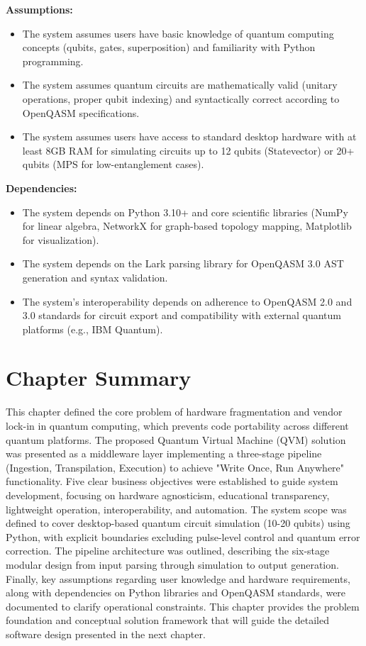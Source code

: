 \textbf{Assumptions:}
\begin{itemize}
    \item The system assumes users have basic knowledge of quantum computing concepts (qubits, gates, superposition) and familiarity with Python programming.
    \item The system assumes quantum circuits are mathematically valid (unitary operations, proper qubit indexing) and syntactically correct according to OpenQASM specifications.
    \item The system assumes users have access to standard desktop hardware with at least 8GB RAM for simulating circuits up to 12 qubits (Statevector) or 20+ qubits (MPS for low-entanglement cases).
\end{itemize}

\textbf{Dependencies:}
\begin{itemize}
    \item The system depends on Python 3.10+ and core scientific libraries (NumPy for linear algebra, NetworkX for graph-based topology mapping, Matplotlib for visualization).
    \item The system depends on the Lark parsing library for OpenQASM 3.0 AST generation and syntax validation.
    \item The system's interoperability depends on adherence to OpenQASM 2.0 and 3.0 standards for circuit export and compatibility with external quantum platforms (e.g., IBM Quantum).
\end{itemize}

\section{Chapter Summary}

This chapter defined the core problem of hardware fragmentation and vendor lock-in in quantum computing, which prevents code portability across different quantum platforms. The proposed Quantum Virtual Machine (QVM) solution was presented as a middleware layer implementing a three-stage pipeline (Ingestion, Transpilation, Execution) to achieve "Write Once, Run Anywhere" functionality. Five clear business objectives were established to guide system development, focusing on hardware agnosticism, educational transparency, lightweight operation, interoperability, and automation. The system scope was defined to cover desktop-based quantum circuit simulation (10-20 qubits) using Python, with explicit boundaries excluding pulse-level control and quantum error correction. The pipeline architecture was outlined, describing the six-stage modular design from input parsing through simulation to output generation. Finally, key assumptions regarding user knowledge and hardware requirements, along with dependencies on Python libraries and OpenQASM standards, were documented to clarify operational constraints. This chapter provides the problem foundation and conceptual solution framework that will guide the detailed software design presented in the next chapter.
